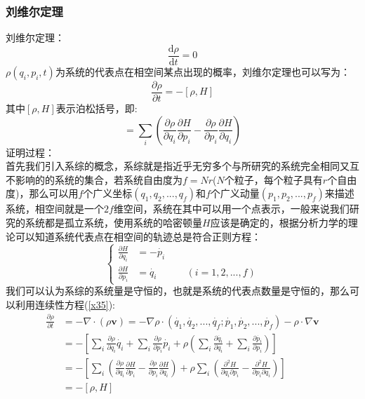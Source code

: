 \documentclass[12pt]{article}
\begin{document}
\subsubsection{刘维尔定理}
\noindent
刘维尔定理：\begin{equation}
	\frac{\mathrm{d} \rho}{\mathrm{d}t}=0
\end{equation}
$\rho(q_i,p_i,t)$为系统的代表点在相空间某点出现的概率，刘维尔定理也可以写为：
\begin{equation}
	\frac{\partial \rho}{\partial t}=-[\rho, H]
\end{equation}
其中$[\rho , H]$表示泊松括号，即:
\begin{equation}
	[\rho, H]=\sum_i (\frac{\partial \rho}{\partial q_i}\frac{\partial H}{\partial p_i}-\frac{\partial \rho}{\partial p_i}\frac{\partial H}{\partial q_i})
\end{equation}
证明过程：\\
首先我们引入系综的概念，系综就是指近乎无穷多个与所研究的系统完全相同又互不影响的的系统的集合，若系统自由度为$f=Nr$($N$个粒子，每个粒子具有$r$个自由度)，那么可以用$f$个广义坐标$(q_1,q_2,...,q_f)$和$f$个广义动量$(p_1,p_2,...,p_f)$来描述系统，相空间就是一个$2f$维空间，系统在其中可以用一个点表示，一般来说我们研究的系统都是孤立系统，使用系统的哈密顿量$H$应该是确定的，根据分析力学的理论可以知道系统代表点在相空间的轨迹总是符合正则方程：
\begin{equation}
\left\{\begin{split}
	\frac{\partial H}{\partial q_i}&=-\dot{p_i}\\
	\frac{\partial H}{\partial p_i}&=\dot{q_i}\quad\quad\quad (i=1,2,...,f)
\end{split}\right.
\end{equation}
我们可以认为系综的系统量是守恒的，也就是系统的代表点数量是守恒的，那么可以利用连续性方程(\ref{x35}):
\begin{equation}
	\begin{split}
	\frac{\partial \rho}{\partial t}&=-\nabla \cdot (\rho \mathbf{v})=-\nabla\rho\cdot(\dot{q_1},\dot{q_2},...,\dot{q_f};\dot{p_1},\dot{p_2},...,\dot{p_f})-\rho \cdot \nabla \mathbf{v}\\
	&=-[\sum_i \frac{\partial \rho}{\partial q_i}\dot{q_i}+\sum_i\frac{\partial \rho}{\partial p_i}\dot{p_i}+\rho(\sum_i \frac{\partial \dot{q_i}}{\partial q_i}+\sum_i \frac{\partial \dot{p_i}}{\partial p_i})]\\
	&=-[
	\sum_i (\frac{\partial \rho}{\partial q_i}\frac{\partial H}{\partial p_i}-\frac{\partial \rho}{\partial p_i}\frac{\partial H}{\partial q_i})+\rho\sum_i( \frac{\partial^2 H}{\partial q_i\partial p_i}-\frac{\partial^2 H}{\partial p_i \partial q_i})
	]\\
	&=-[\rho,H]
\end{split}
\end{equation}
\end{document}
